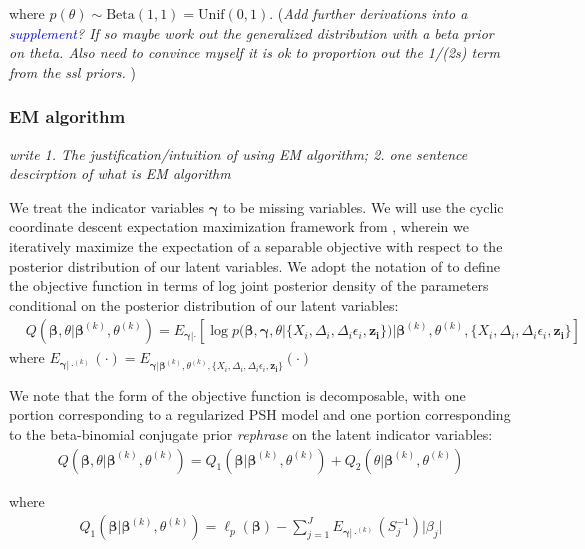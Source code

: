\documentclass[11pt,a4paper]{article}
\let\cite\parencite
\begin{document}
\noindent where $p(\theta) \sim \mathrm{Beta(1,1)} = \mathrm{Unif}(0,1)$.  (\textit{Add further derivations into a \textcolor{blue}{supplement}? If so maybe work out the generalized distribution with a beta prior on theta. Also need to convince myself it is ok to proportion out the 1/(2s) term from the ssl priors. })


\subsubsection{EM algorithm}
\textit{write 1. The justification/intuition of using EM algorithm; 2. one sentence descirption of what is EM algorithm}

We treat the indicator variables $\boldsymbol{\gamma}$ to be missing variables. We will use the cyclic coordinate descent expectation maximization framework from \cite{Tang2017}, wherein we iteratively maximize the expectation of a separable objective  with respect to the posterior distribution of our latent variables. We adopt the notation of \cite{RockovaGeorge2014} to define the objective function in terms of log joint posterior density of the parameters  conditional on the posterior distribution of our latent variables:
\begin{align*}
    &Q(\boldsymbol{\beta}, \theta|\boldsymbol{\beta}^{(k)}, \theta^{(k)}) = E_{\boldsymbol{\gamma}|\cdot}\left[ \log p(\boldsymbol{\beta}, \boldsymbol{\gamma}, \theta| \{X_i, \Delta_i, \Delta_{i}\epsilon_i, \mathbf{z_i}\})| \boldsymbol{\beta}^{(k)}, \theta^{(k)},\{X_i, \Delta_i, \Delta_{i}\epsilon_i, \mathbf{z_i}\} \right]
\end{align*}
\noindent where $E_{\boldsymbol{\gamma}|\cdot^{(k)}}(\cdot) = E_{\boldsymbol{\gamma}|\boldsymbol{\beta}^{(k)}, \theta^{(k)},\{X_i, \Delta_i, \Delta_{i}\epsilon_i, \mathbf{z_i}\}}(\cdot)$

We note that the form of the objective function is decomposable, with one portion corresponding to a regularized PSH model and one portion corresponding to the beta-binomial conjugate prior \textit{rephrase} on the latent indicator variables:
\begin{align*}
    Q(\boldsymbol{\beta}, \theta|\boldsymbol{\beta}^{(k)}, \theta^{(k)}) = Q_1(\boldsymbol{\beta}|\boldsymbol{\beta}^{(k)}, \theta^{(k)})  + Q_2( \theta|\boldsymbol{\beta}^{(k)}, \theta^{(k)})
\end{align*}

where 
\begin{align*}
    Q_1(\boldsymbol{\beta}|\boldsymbol{\beta}^{(k)}, \theta^{(k)}) = \ell_p(\boldsymbol{\beta})
    - \sum_{j=1}^{J} E_{\boldsymbol{\gamma}|\cdot^{(k)}}(S_j^{-1}) \lvert \beta_j \rvert
\end{align*}
\end{document}
